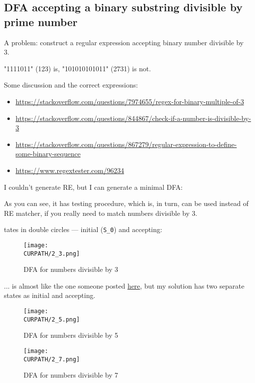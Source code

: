\subsection{DFA accepting a binary substring divisible by prime number}

\renewcommand{\CURPATH}{synth/DFA}

A problem: construct a regular expression accepting binary number divisible by 3.

"1111011" (123) is, "101010101011" (2731) is not.

Some discussion and the correct expressions:

\begin{itemize}
\item \url{https://stackoverflow.com/questions/7974655/regex-for-binary-multiple-of-3}
\item \url{https://stackoverflow.com/questions/844867/check-if-a-number-is-divisible-by-3}
\item \url{https://stackoverflow.com/questions/867279/regular-expression-to-define-some-binary-sequence}
\item \url{https://www.regextester.com/96234}
\end{itemize}

I couldn't generate \ac{RE}, but I can generate a minimal \ac{DFA}:



As you can see, it has testing procedure, which is, in turn, can be used instead of RE matcher, if you really need to match
numbers divisible by 3.

tates in double circles --- initial (\verb|S_0|) and accepting:

\begin{figure}[H]
\centering
\texttt{[image: \\CURPATH/2\_3.png]}
\caption{DFA for numbers divisible by 3}
\end{figure}

... is almost like the one someone posted \href{https://stackoverflow.com/questions/7974655/regex-for-binary-multiple-of-3}{here},
but my solution has two separate states as initial and accepting.

\begin{figure}[H]
\centering
\texttt{[image: \\CURPATH/2\_5.png]}
\caption{DFA for numbers divisible by 5}
\end{figure}

\begin{figure}[H]
\centering
\texttt{[image: \\CURPATH/2\_7.png]}
\caption{DFA for numbers divisible by 7}
\end{figure}

